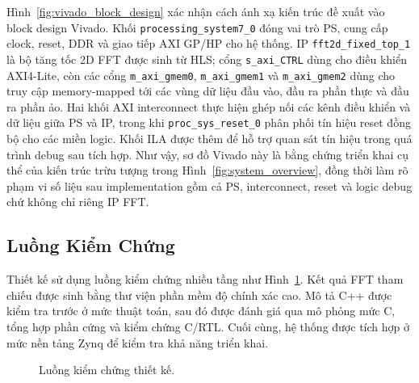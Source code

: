 ﻿\documentclass[conference]{IEEEtran}
\begin{document}
Hình~\ref{fig:vivado_block_design} xác nhận cách ánh xạ kiến trúc đề xuất vào block design Vivado. Khối \texttt{processing\_system7\_0} đóng vai trò PS, cung cấp clock, reset, DDR và giao tiếp AXI GP/HP cho hệ thống. IP \texttt{fft2d\_fixed\_top\_1} là bộ tăng tốc 2D FFT được sinh từ HLS; cổng \texttt{s\_axi\_CTRL} dùng cho điều khiển AXI4-Lite, còn các cổng \texttt{m\_axi\_gmem0}, \texttt{m\_axi\_gmem1} và \texttt{m\_axi\_gmem2} dùng cho truy cập memory-mapped tới các vùng dữ liệu đầu vào, đầu ra phần thực và đầu ra phần ảo. Hai khối AXI interconnect thực hiện ghép nối các kênh điều khiển và dữ liệu giữa PS và IP, trong khi \texttt{proc\_sys\_reset\_0} phân phối tín hiệu reset đồng bộ cho các miền logic. Khối ILA được thêm để hỗ trợ quan sát tín hiệu trong quá trình debug sau tích hợp. Như vậy, sơ đồ Vivado này là bằng chứng triển khai cụ thể của kiến trúc trừu tượng trong Hình~\ref{fig:system_overview}, đồng thời làm rõ phạm vi số liệu sau implementation gồm cả PS, interconnect, reset và logic debug chứ không chỉ riêng IP FFT.

\subsection{Luồng Kiểm Chứng}
Thiết kế sử dụng luồng kiểm chứng nhiều tầng như Hình~\ref{fig:verification_flow}. Kết quả FFT tham chiếu được sinh bằng thư viện phần mềm độ chính xác cao. Mô tả C++ được kiểm tra trước ở mức thuật toán, sau đó được đánh giá qua mô phỏng mức C, tổng hợp phần cứng và kiểm chứng C/RTL. Cuối cùng, hệ thống được tích hợp ở mức nền tảng Zynq để kiểm tra khả năng triển khai.

\begin{figure}[htbp]
    \centering
    \caption{Luồng kiểm chứng thiết kế.}
    \label{fig:verification_flow}
\end{figure}
\end{document}
